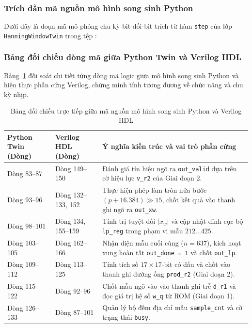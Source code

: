 \subsubsection*{Trích dẫn mã nguồn mô hình song sinh Python}
Dưới đây là đoạn mã mô phỏng chu kỳ bit-đối-bit trích từ hàm \texttt{step} của lớp \texttt{HanningWindowTwin} trong tệp :



\subsubsection*{Bảng đối chiếu dòng mã giữa Python Twin và Verilog HDL}
Bảng~\ref{tab:ch06_twin_vs_hdl} đối soát chi tiết từng dòng mã logic giữa mô hình song sinh Python và hiện thực phần cứng Verilog, chứng minh tính tương đương về chức năng và chu kỳ nhịp.

\begin{table}[H]
\centering
\caption{Bảng đối chiếu trực tiếp giữa mã nguồn mô hình song sinh Python và Verilog HDL}
\label{tab:ch06_twin_vs_hdl}
\footnotesize
\begin{tabularx}{\textwidth}{p{2.6cm} p{2.6cm} X}
\toprule
\textbf{Python Twin (Dòng)} & \textbf{Verilog HDL (Dòng)} & \textbf{Ý nghĩa kiến trúc và vai trò phần cứng} \\
\midrule
Dòng 83--87 & Dòng 149--150 & Đánh giá tín hiệu ngõ ra \texttt{out\_valid} dựa trên cờ hiệu lực \texttt{v\_r2} của Giai đoạn 2. \\
\addlinespace[3pt]
Dòng 93--96 & Dòng 132--133, 152 & Thực hiện phép làm tròn nửa bước $(p + 16.384) \gg 15$, chốt kết quả vào thanh ghi ngõ ra \texttt{out\_xw}. \\
\addlinespace[3pt]
Dòng 98--101 & Dòng 134, 155--159 & Tính trị tuyệt đối $|x_w|$ và cập nhật đỉnh cục bộ \texttt{lp\_reg} trong phạm vi mẫu $212 \dots 425$. \\
\addlinespace[3pt]
Dòng 103--105 & Dòng 162--166 & Nhận diện mẫu cuối cùng ($n = 637$), kích hoạt xung hoàn tất \texttt{out\_done = 1} và chốt \texttt{out\_lp}. \\
\addlinespace[3pt]
Dòng 109--112 & Dòng 113--125 & Tính tích số $17 \times 17$-bit có dấu và chốt vào thanh ghi đường ống \texttt{prod\_r2} (Giai đoạn 2). \\
\addlinespace[3pt]
Dòng 115--122 & Dòng 92--96 & Chốt mẫu ngõ vào vào thanh ghi trễ \texttt{d\_r1} và đọc giá trị hệ số \texttt{w\_q} từ ROM (Giai đoạn 1). \\
\addlinespace[3pt]
Dòng 126--133 & Dòng 87--101 & Quản lý bộ đếm địa chỉ mẫu \texttt{sample\_cnt} và cờ trạng thái \texttt{busy}. \\
\bottomrule
\end{tabularx}
\end{table}


